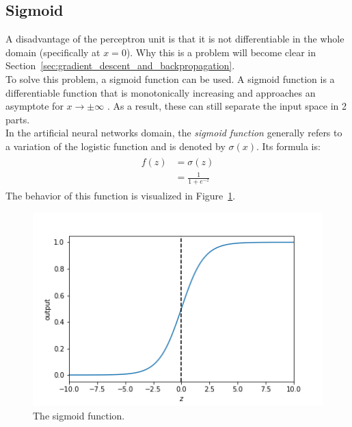 \subsection{Sigmoid} %
\label{ssub:sigmoid}
A disadvantage of the perceptron unit is that it is not differentiable in the whole domain (specifically at $x=0$). Why this is a problem will become clear in Section~\ref{sec:gradient_descent_and_backpropagation}.\\
To solve this problem, a sigmoid function can be used. A sigmoid function is a differentiable function that is monotonically increasing and approaches an asymptote for $x \to \pm\infty$ \citep{series/lncs/LeCunBOM12}. As a result, these can still separate the input space in 2 parts.\\
In the artificial neural networks domain, the \textit{sigmoid function} generally refers to a variation of the logistic function and is denoted by $\sigma(x)$. Its formula is:
\begin{align}
    \begin{split}
        f(z) &= \sigma(z)\\
        &= \frac{1}{1+e^{-z}}
    \end{split}
\end{align}
The behavior of this function is visualized in Figure~\ref{fig:sigmoid}.
\begin{figure}[htb]
    \centering
    \includegraphics[width=.8\linewidth]{images/activation_functions/sigmoid.png}
    \caption[The sigmoid function]{The sigmoid function.}
    \label{fig:sigmoid}
\end{figure}

